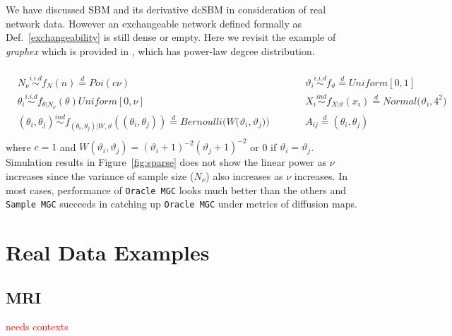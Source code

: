 \documentclass[12pt]{article}
\theoremstyle{definition}
\begin{document}
We have discussed SBM and its derivative dcSBM in consideration of real network data. However an exchangeable network defined formally as Def.~\ref{exchangeability} is still dense or empty. Here we revisit the example of \textit{graphex} which is provided in \cite{veitch2015class}, which has power-law degree distribution.

\begin{eqnarray}
\begin{gathered}
\begin{split}
		 N_{\nu} \overset{i.i.d}{\sim} f_{N}(n)   \stackrel{d}{=} Poi( c \nu)  &   \quad \quad &
		\vartheta_{i}  \overset{i.i.d}{\sim} f_{\vartheta} \stackrel{d}{=} Uniform[0,1] \\
		 \theta_{i} \overset{i.i.d}{\sim} f_{\theta |  N_{\nu}} (\theta)     Uniform[0, \nu]  & \quad \quad  & X_{i}    \overset{ind}{\sim} f_{X | \vartheta}(x_{i}) \stackrel{d}{=} Normal \big( \vartheta_{i}, 4^2 \big)  \\ 
		(\theta_{i}, \theta_{j})  \overset{ind}{\sim} f_{ (\theta_{i}, \theta_{j})  | W, \vartheta} ( (\theta_{i}, \theta_{j}) ) \stackrel{d}{=}   Bernoulli \big( W\big( \vartheta_{i}, \vartheta_{j} \big) \big)  &  \quad \quad & A_{ij}  \stackrel{d}{=} (\theta_{i}, \theta_{j})
\label{eq:sparse}
\end{split}
\end{gathered}	 
\end{eqnarray}	
where $c = 1$ and $W(\vartheta_{i}, \vartheta_{j} ) = (\vartheta_{i} + 1)^{-2} ( \vartheta_{j} + 1 )^{-2}$ or 0 if $\vartheta_{i} = \vartheta_{j}$. 
Simulation results in Figure~\ref{fig:sparse} does not show the linear power as $\nu$ increases since the variance of sample size ($N_{\nu}$) also increases as $\nu$ increases. In most cases, performance of \texttt{Oracle MGC} looks much better than the others and \texttt{Sample MGC} succeeds in catching up \texttt{Oracle MGC} under metrics of diffusion maps. 


\section{Real Data Examples}
\label{sec:real}
	
\subsection{MRI}
	
\textcolor{red}{needs contexts}	
	
\end{document}
